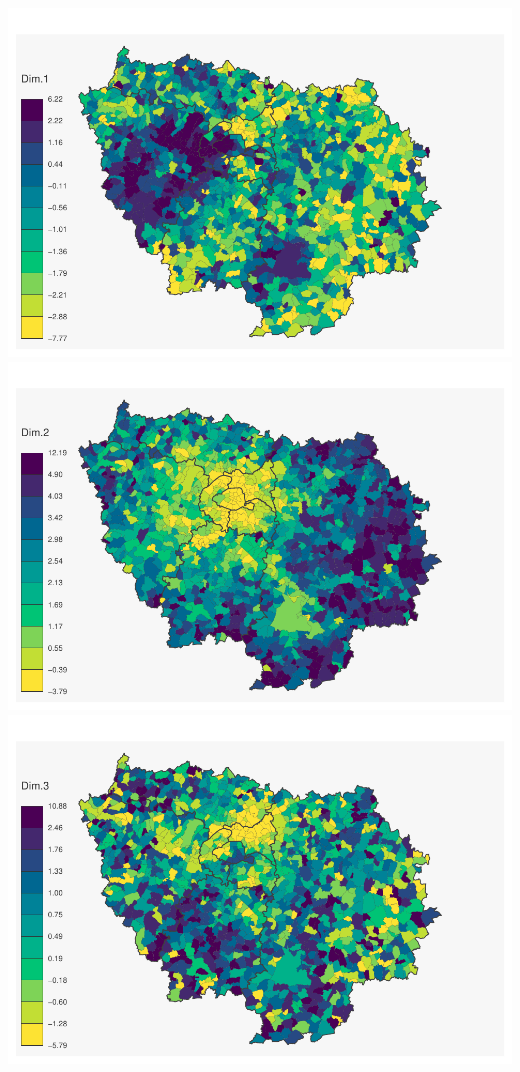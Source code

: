 \documentclass[
]{book}
\begin{document}
\includegraphics{bookdown-demo_files/figure-latex/unnamed-chunk-75-1.pdf} \includegraphics{bookdown-demo_files/figure-latex/unnamed-chunk-75-2.pdf} \includegraphics{bookdown-demo_files/figure-latex/unnamed-chunk-75-3.pdf}
\end{document}
